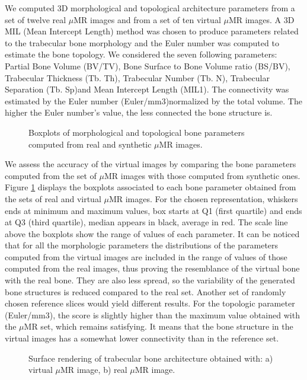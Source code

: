 We computed 3D morphological and topological architecture parameters from a set of twelve real $\mu$MR images and from a set of ten virtual $\mu$MR images. 
A 3D MIL (Mean Intercept Length) method was chosen to produce parameters related to the trabecular bone morphology and the Euler number was computed to estimate the bone topology. 
We considered the seven following parameters: Partial Bone Volume (BV/TV), Bone Surface to Bone Volume ratio (BS/BV), Trabecular Thickness (Tb. Th), Trabecular Number (Tb. N), Trabecular Separation (Tb. Sp)and Mean Intercept Length (MIL1). 
The connectivity was estimated by the Euler number (Euler/mm3)normalized by the total volume. The higher the Euler number's value, the less connected the bone structure is.

\begin{figure}
 \centering 
\caption{Boxplots of morphological and topological bone parameters computed from real and synthetic $\mu$MR images.}
 \label{fig:bone_parametres}
\end{figure}

We assess the accuracy of the virtual images by comparing the bone parameters computed from the set of 
$\mu$MR images with those computed from synthetic ones. Figure \ref{fig:bone_parametres} displays the boxplots associated to each bone parameter obtained from the sets of real and virtual $\mu$MR images. For the chosen representation, whiskers ends at minimum and maximum values, box starts at Q1 (first quartile) and ends at Q3 (third quartile), median appears in black, average in red. The scale line above the boxplots show the range of values of each parameter. It can be noticed that for all the morphologic parameters the distributions of the parameters computed from the virtual images are included in the range of values of those computed from the real images, thus proving the resemblance of the virtual bone with the real bone. They are also less spread, so the variability of the generated bone structures is reduced compared to the real set. Another set of randomly chosen reference slices would yield different results. 
For the topologic parameter (Euler/mm3), the score is slightly higher than the maximum value obtained with the $\mu$MR set, which remains satisfying. It means that the bone structure in the virtual images has a somewhat lower connectivity than in the reference set.  

\begin{figure} 
 \centering 
{}
 \caption{Surface rendering of trabecular bone architecture obtained with: a) virtual $\mu$MR image, b) real $\mu$MR image.}
 \label{fig:bone_surface_rendering} 
\end{figure}

